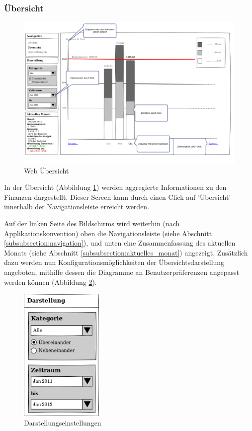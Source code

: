 \subsubsection{Übersicht}

\begin{figure}[htl]
\centering
\includegraphics[width=\textwidth]{img/web_uebersicht}
\caption{Web \"Ubersicht}
\label{fig:web_uebersicht}
\end{figure}

In der Übersicht (Abbildung \ref{fig:web_uebersicht}) werden aggregierte Informationen zu den Finanzen dargestellt.
Dieser Screen kann durch einen Click auf 'Übersicht' innerhalb der
Navigationsleiste erreicht werden.

Auf der linken Seite des Bildschirms wird weiterhin (nach
Applikationskonvention) oben die Navigationsleiste (siehe Abschnitt
\ref{subsubsection:navigation}), und unten eine Zusammenfassung des aktuellen
Monats (siehe Abschnitt \ref{subsubsection:aktuelles_monat}) angezeigt.
Zusätzlich dazu werden nun Konfigurationsmöglichkeiten der
Übersichtsdarstel\-lung angeboten, mithilfe dessen die Diagramme an
Benutzerpräferenzen angepasst werden können (Abbildung \ref{fig:web_display_settings}).

\begin{figure}[htl]
\centering
\includegraphics[width=4cm]{img/web_display_settings}
\caption{Darstellungseinstellungen}
\label{fig:web_display_settings}
\end{figure}

